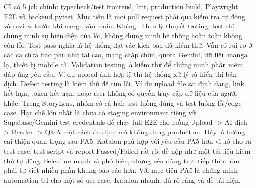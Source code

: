 {}CI có 5 job chính: typecheck/test frontend, lint, production build, Playwright E2E và backend pytest.\markdownRendererParagraphSeparator
{}Mục tiêu là mọi pull request phải qua kiểm tra tự động và review trước khi merge vào main.\markdownRendererInterblockSeparator
{}
\markdownRendererSectionEnd \markdownRendererSectionBegin
{}\markdownRendererInterblockSeparator
{}Không. Theo lý thuyết testing, test chỉ chứng minh sự hiện diện của lỗi, không chứng minh hệ thống hoàn toàn không còn lỗi.\markdownRendererParagraphSeparator
{}Test pass nghĩa là hệ thống đạt các kịch bản đã kiểm thử. Vẫn có rủi ro ở các ca chưa bao phủ như tải cao, mạng chập chờn, quota Gemini, dữ liệu manga lạ, thiết bị mobile cũ.\markdownRendererInterblockSeparator
{}
\markdownRendererSectionEnd \markdownRendererSectionBegin
{}\markdownRendererInterblockSeparator
{}Validation testing là kiểm thử để chứng minh phần mềm đáp ứng yêu cầu. Ví dụ upload ảnh hợp lệ thì hệ thống xử lý và hiển thị bản dịch.\markdownRendererParagraphSeparator
{}Defect testing là kiểm thử để tìm lỗi. Ví dụ upload file sai định dạng, link hết hạn, token hết hạn, hoặc user không có quyền truy cập dữ liệu của người khác.\markdownRendererParagraphSeparator
{}Trong StoryLens, nhóm có cả hai: test luồng đúng và test luồng lỗi/edge case.\markdownRendererInterblockSeparator
{}
\markdownRendererSectionEnd \markdownRendererSectionBegin
{}\markdownRendererInterblockSeparator
{}Hạn chế lớn nhất là chưa có staging environment riêng với Supabase/Gemini test credentials để chạy full E2E cho luồng Upload -> AI dịch -> Reader -> Q&A một cách ổn định mà không đụng production.\markdownRendererParagraphSeparator
{}Đây là hướng cải thiện quan trọng sau PA5.\markdownRendererInterblockSeparator
{}\markdownRendererThematicBreak{}\markdownRendererInterblockSeparator
{}
\markdownRendererSectionEnd 
\markdownRendererSectionEnd \markdownRendererSectionBegin
{}\markdownRendererInterblockSeparator
{}\markdownRendererSectionBegin
{}\markdownRendererInterblockSeparator
{}Katalon phù hợp với yêu cầu PA5 hơn vì nó cho ra test case, test script và report Passed/Failed rất rõ, dễ nộp như một tài liệu kiểm thử tự động.\markdownRendererParagraphSeparator
{}Selenium mạnh và phổ biến, nhưng nếu dùng trực tiếp thì nhóm phải tự viết nhiều phần khung báo cáo hơn. Với mục tiêu PA5 là chứng minh automation UI cho một số use case, Katalon nhanh, đủ rõ ràng và dễ tái hiện.\markdownRendererInterblockSeparator
